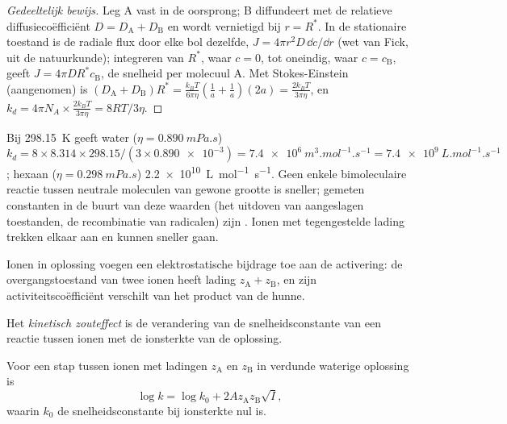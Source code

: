 \begin{proof}[Gedeeltelijk bewijs]
Leg A vast in de oorsprong; B diffundeert met de relatieve
diffusiecoëfficiënt $D =
D_{\mathrm A} + D_{\mathrm B}$ en wordt vernietigd bij $r = R^*$. In de
stationaire toestand is de radiale flux door elke bol dezelfde, $J = 4\pi r^2D\,\dd c/\dd r$ (wet van
Fick, uit de natuurkunde); integreren van $R^*$, waar $c = 0$, tot
oneindig, waar $c = c_{\mathrm B}$, geeft
$J = 4\pi DR^*c_{\mathrm B}$, de snelheid per molecuul A. Met
Stokes-Einstein (aangenomen) is
$(D_{\mathrm A} + D_{\mathrm B})R^* = \frac{k_BT}{6\pi\eta}(\frac{1}{a} + \frac1a)(2a) = \frac{2k_BT}{3\pi\eta}$, en $k_d = 4\pi N_A \times
\frac{2k_BT}{3\pi\eta} = 8RT/3\eta$.
\end{proof}

\begin{example}\label{ex:b3:rate-theories:speed-limit}
Bij \qty{298.15}{K} geeft water ($\eta = \qty{0.890}{mPa.s}$) $k_d = 8 \times 8.314 \times
298.15/(3 \times \num{0.890e-3}) = \qty{7.4e6}{m^3.mol^{-1}.s^{-1}} = \qty{7.4e9}{L.mol^{-1}.s^{-1}}$; hexaan
($\eta = \qty{0.298}{mPa.s}$) \qty{2.2e10}{L.mol^{-1}.s^{-1}}. Geen enkele
bimoleculaire reactie tussen neutrale moleculen van gewone grootte is
sneller; gemeten constanten in de buurt van deze waarden (het uitdoven
van aangeslagen toestanden, de recombinatie van radicalen) zijn
. Ionen met tegengestelde lading trekken elkaar aan
en kunnen sneller gaan.
\end{example}

Ionen in oplossing voegen een elektrostatische bijdrage toe aan de
activering: de overgangstoestand van twee ionen heeft lading $z_{\mathrm A} + z_{\mathrm B}$, en zijn
activiteitscoëfficiënt verschilt van het product van de hunne.

\begin{definition}\label{def:b3:rate-theories:salt}
Het \emph{kinetisch zouteffect} is de
verandering van de snelheidsconstante van een reactie tussen ionen met de
ionsterkte van de oplossing.
\end{definition}

\begin{proposition}\label{prop:b3:rate-theories:bronsted-bjerrum}
Voor een stap tussen ionen met ladingen $z_{\mathrm A}$ en $z_{\mathrm B}$ in
verdunde waterige oplossing is
\[
  \log k = \log k_0 + 2Az_{\mathrm A}z_{\mathrm B}\sqrt I,
\]
waarin $k_0$ de snelheidsconstante bij ionsterkte nul is.
\end{proposition}

